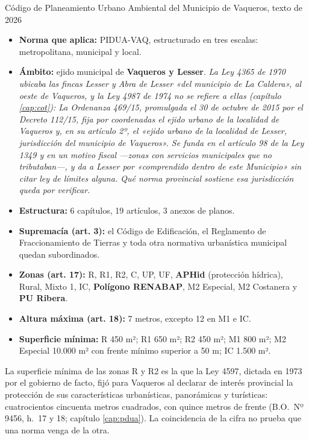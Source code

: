 \begin{ficha}{Código de Planeamiento Urbano Ambiental del Municipio de Vaqueros, texto de 2026}
\begin{itemize}[leftmargin=*,nosep]
\item \textbf{Norma que aplica:} PIDUA-VAQ, estructurado en tres escalas: metropolitana, municipal y local.
\item \textbf{Ámbito:} ejido municipal de \textbf{Vaqueros y Lesser}. \textit{La Ley 4365 de 1970 ubicaba las fincas Lesser y Abra de Lesser «del municipio de La Caldera», al oeste de Vaqueros, y la Ley 4987 de 1974 no se refiere a ellas (capítulo \ref{cap:cot}): La Ordenanza 469/15, promulgada el 30 de octubre de 2015 por el Decreto 112/15, fija por coordenadas el ejido urbano de la localidad de Vaqueros y, en su artículo 2º, el «ejido urbano de la localidad de Lesser, jurisdicción del municipio de Vaqueros». Se funda en el artículo 98 de la Ley 1349 y en un motivo fiscal ---zonas con servicios municipales que no tributaban---, y da a Lesser por «comprendido dentro de este Municipio» sin citar ley de límites alguna. Qué norma provincial sostiene esa jurisdicción queda por verificar.}
\item \textbf{Estructura:} 6 capítulos, 19 artículos, 3 anexos de planos.
\item \textbf{Supremacía (art. 3):} el Código de Edificación, el Reglamento de Fraccionamiento de Tierras y toda otra normativa urbanística municipal quedan subordinados.
\item \textbf{Zonas (art. 17):} R, R1, R2, C, UP, UF, \textbf{APHid} (protección hídrica), Rural, Mixto 1, IC, \textbf{Polígono RENABAP}, M2 Especial, M2 Costanera y \textbf{PU Ribera}.
\item \textbf{Altura máxima (art. 18):} 7 metros, excepto 12 en M1 e IC.
\item \textbf{Superficie mínima:} R 450 m²; R1 650 m²; R2 450 m²; M1 800 m²; M2 Especial 10.000 m² con frente mínimo superior a 50 m; IC 1.500 m².
\end{itemize}
\end{ficha}

La superficie mínima de las zonas R y R2 es la que la Ley 4597, dictada en 1973 por el gobierno de facto, fijó para Vaqueros al declarar de interés provincial la protección de sus características urbanísticas, panorámicas y turísticas: cuatrocientos cincuenta metros cuadrados, con quince metros de frente (B.O.\ Nº 9456, h.\ 17 y 18; capítulo \ref{cap:pdua}). La coincidencia de la cifra no prueba que una norma venga de la otra.

